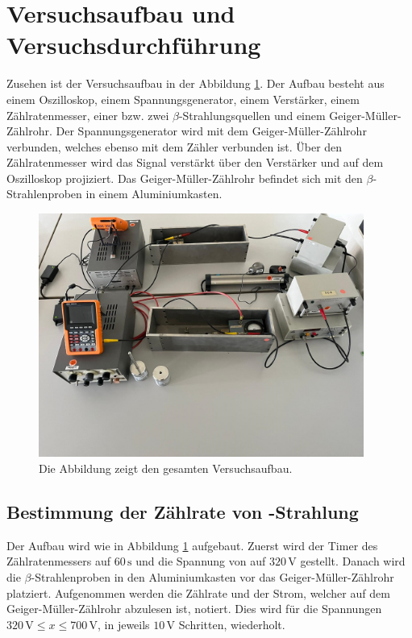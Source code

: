 \section{Versuchsaufbau und Versuchsdurchführung}

\begin{flushleft}
    Zusehen ist der Versuchsaufbau in der Abbildung \ref{Abbildung5}. 
    Der Aufbau besteht aus einem Oszilloskop, einem Spannungsgenerator, einem Verstärker, einem Zählratenmesser, einer bzw. zwei $\beta$-Strahlungsquellen und einem Geiger-Müller-Zählrohr.
    Der Spannungsgenerator wird mit dem Geiger-Müller-Zählrohr verbunden, welches ebenso mit dem Zähler verbunden ist. 
    Über den Zählratenmesser wird das Signal verstärkt über den Verstärker und auf dem Oszilloskop projiziert.
    Das Geiger-Müller-Zählrohr befindet sich mit den $\beta$-Strahlenproben in einem Aluminiumkasten.
\end{flushleft}

\begin{figure}[H]
    \centering
    \includegraphics[height=80mm]{bilder/Ab5.jpeg}
    \caption{Die Abbildung zeigt den gesamten Versuchsaufbau.\label{Abbildung5} }
\end{figure}

\subsection{Bestimmung der Zählrate von \textbeta -Strahlung}

\begin{flushleft}
    Der Aufbau wird wie in Abbildung \ref{Abbildung5} aufgebaut. 
    Zuerst wird der Timer des Zählratenmessers auf $60\,\unit{\second}$ und die Spannung von auf $320\,\unit{\volt}$ gestellt.
    Danach wird die $\beta$-Strahlenproben in den Aluminiumkasten vor das Geiger-Müller-Zählrohr platziert. 
    Aufgenommen werden die Zählrate und der Strom, welcher auf dem Geiger-Müller-Zählrohr abzulesen ist, notiert.
    Dies wird für die Spannungen $320\,\unit{\volt} \leq x \leq 700\,\unit{\volt}$, in jeweils $10\,\unit{\volt}$ Schritten, wiederholt.
\end{flushleft}

